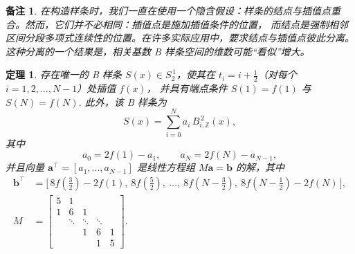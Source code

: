 \documentclass[a4paper]{ctexart}
\newtheorem{theorem}{定理}
\newtheorem{remark}{备注}
\numberwithin{theorem}{section}
\numberwithin{equation}{section}
\numberwithin{figure}{section}
\numberwithin{remark}{section}
\begin{document}
\begin{remark}
    \label{rem::knots_vs_sites}
在构造样条时，我们一直在使用一个隐含假设：样条的结点与插值点重合。然而，它们并不必相同：插值点是施加插值条件的位置，
而结点是强制相邻区间分段多项式连续性的位置。在许多实际应用中，要求结点与插值点彼此分离。
这种分离的一个结果是，相关基数 B 样条空间的维数可能“看似”增大。
\end{remark}

\begin{theorem}
    \label{thm::unique_quadratic_midpoints}
存在唯一的 B 样条 $S(x)\in S^{\,1}_{2}$，使其在 $t_i=i+\tfrac{1}{2}$（对每个 $i=1,2,\ldots,N-1$）处插值 $f(x)$，
并具有端点条件 $S(1)=f(1)$ 与 $S(N)=f(N)$. 此外，该 B 样条为
\begin{equation} 
S(x)=\sum_{i=0}^{N} a_i\,B^{\,2}_{i,\mathbb{Z}}(x),
\end{equation}
其中
\begin{equation} 
    \label{eq::quadratic_boundary_conditions}
a_0=2f(1)-a_1,\qquad a_N=2f(N)-a_{N-1},
\end{equation}
并且向量 $\mathbf{a}^{\top}=[a_1,\ldots,a_{N-1}]$ 是线性方程组 $M\mathbf{a}=\mathbf{b}$ 的解，其中
\[
\begin{aligned}
\mathbf{b}^{\top}&=\bigl[\,8f\!\left(\tfrac{3}{2}\right)-2f(1),\ 8f\!\left(\tfrac{5}{2}\right),\ \ldots,
\ 8f\!\left(N-\tfrac{3}{2}\right),\ 8f\!\left(N-\tfrac{1}{2}\right)-2f(N)\,\bigr], \\
M&=
\begin{bmatrix}
5 & 1 \\
1 & 6 & 1 \\
  & \ddots & \ddots & \ddots \\
  &  & 1 & 6 & 1 \\
  &  &  & 1 & 5
\end{bmatrix}.
\end{aligned}
\]
\end{theorem}
\end{document}
